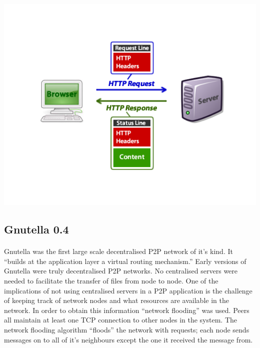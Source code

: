 \documentclass[11pt]{amsart}
\begin{document}
\paragraph{}
\includegraphics[scale=.7]{http_diagram}\cite{http://probablycopyrighted.com/wp-content/uploads/http_diagram.png}

\subsection{Gnutella 0.4}\cite{GnutellaCase}
\paragraph{}
Gnutella was the first large scale decentralised P2P network of it's kind. It ``builds at the application layer a virtual routing mechanism.''\cite{GnutellaCase} Early versions of Gnutella were truly decentralised P2P networks. No centralised servers were needed to facilitate the transfer of files from node to node.
One of the implications of not using centralised servers in a P2P application is the challenge of keeping track of network nodes and what resources are available in the network. In order to obtain this information ``network flooding'' was used. Peers all maintain at least one TCP connection to other nodes in the system. The network flooding algorithm ``floods'' the network with requests; each node sends messages on to all of it's neighbours except the one it received the message from. 
\end{document}
